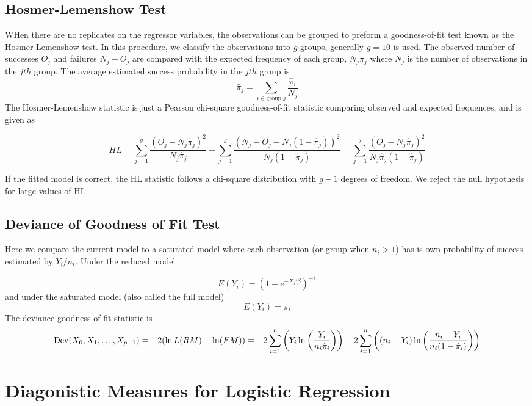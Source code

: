 \subsection{Hosmer-Lemenshow Test}

WHen there are no replicates on the regressor variables, the observations can be grouped to preform a goodness-of-fit test known as the Hosmer-Lemenshow test. In this procedure, we classify the observations into $g$ groups, generally $g=10$ is used. The observed number of successes $O_j$ and failures $N_j - O_j$ are compared with the expected frequency of each group, $N_j\bar{\pi}_j$ where $N_j$ is the number of observations in the $jth$ group. The average estimated success probability in the $jth$ group is 
\[\bar{\pi}_j = \sum_{i \in \text{group }j} \frac{\hat{\pi}_i}{N_j}\]
The Hosmer-Lemenshow statistic is just a Pearson chi-square goodness-of-fit statistic comparing observed and expected frequences, and is given as 

\[HL = \sum_{j=1}^g \frac{(O_j - N_j\hat{\pi}_j)^2}{N_j\hat{\pi}_j} + \sum_{j=1}^g \frac{(N_j - O_j - N_j(1-\hat{\pi}_j))^2}{N_j(1-\hat{\pi}_j)} = \sum_{j=1}^j \frac{(O_j - N_j\hat{\pi}_j)^2}{N_j\hat{\pi}_j(1-\hat{\pi}_j)}\]

If the fitted model is correct, the HL statistic follows a chi-square distribution with $g-1$ degrees of freedom. We reject the null hypothesis for large values of HL.

\subsection{Deviance of Goodness of Fit Test}

Here we compare the current model to a saturated model where each observation (or group when $n_i > 1$) has is own probability of success estimated by $Y_i / n_i$. Under the reduced model 

\[E(Y_i) = \left(1 + e^{-X_i'\beta}\right)^{-1}\]
and under the saturated model (also called the full model)
\[E(Y_i) = \pi_i\]
The deviance goodness of fit statistic is 
\[\operatorname{Dev}(X_0, X_1, \ldots, X_{p-1}) = -2 (\ln L(RM) - \ln(FM)) = -2 \sum_{i=1}^n \left(Y_i\ln\left(\frac{Y_i}{n_i\hat{\pi}_i}\right)\right) - 2\sum_{i=1}^n \left((n_i-Y_i)\ln\left(\frac{n_i - Y_i}{n_i(1-\hat{\pi}_i)}\right)\right)\]


\section{Diagonistic Measures for Logistic Regression}


